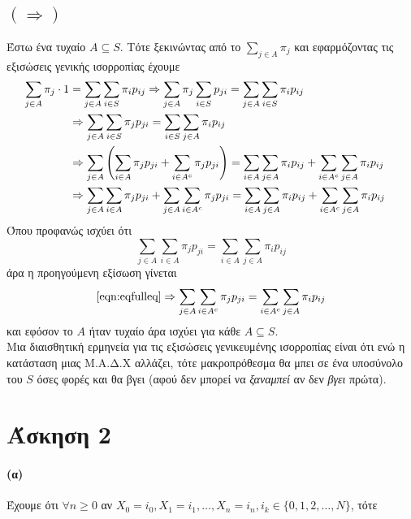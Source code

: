 \documentclass[a4paper,11pt]{article}
\begin{document}
\subsection*{$(\Rightarrow)$}
Έστω ένα τυχαίο $A \subseteq S$. Τότε ξεκινώντας από το $\sum_{j\in A} \pi_j$ και εφαρμόζοντας τις εξισώσεις γενικής ισορροπίας έχουμε
\begin{align}
	\sum_{j\in A} \pi_j \cdot 1  &= \sum_{j\in A} \sum_{i\in S} \pi_i p_{ij}
		\Rightarrow \sum_{j\in A} \pi_j \sum_{i\in S} p_{ji}  = \sum_{j\in A} \sum_{i\in S} \pi_i p_{ij} \notag &\\
		&\Rightarrow \sum_{j\in A} \sum_{i\in S} \pi_j p_{ji}  = \sum_{i\in S} \sum_{j\in A} \pi_i p_{ij} \notag \\
		&\Rightarrow \sum_{j\in A} \left( \sum_{i\in A} \pi_j p_{ji} + \sum_{i\in A^c} \pi_j p_{ji} \right) = \sum_{i\in A} \sum_{j\in A} \pi_i p_{ij} + \sum_{i\in A^c} \sum_{j\in A} \pi_i p_{ij} \notag \\
		&\Rightarrow \sum_{j\in A} \sum_{i\in A} \pi_j p_{ji} + \sum_{j\in A} \sum_{i\in A^c} \pi_j p_{ji} = \sum_{i\in A} \sum_{j\in A} \pi_i p_{ij} + \sum_{i\in A^c} \sum_{j\in A} \pi_i p_{ij} \label{eqn:eqfulleq}
\end{align}
Όπου προφανώς ισχύει ότι
\[
	\sum_{j\in A} \sum_{i\in A} \pi_j p_{ji} = \sum_{i\in A} \sum_{j\in A} \pi_i p_{ij}
\]
άρα η προηγούμενη εξίσωση γίνεται
\[
	\eqref{eqn:eqfulleq} \Rightarrow \sum_{j\in A} \sum_{i\in A^c} \pi_j p_{ji} = \sum_{i\in A^c} \sum_{j\in A} \pi_i p_{ij}
\]
και εφόσον το $A$ ήταν τυχαίο άρα ισχύει για κάθε $A \subseteq S$.
\\[8pt]
Μια διαισθητική ερμηνεία για τις εξισώσεις γενικευμένης ισορροπίας είναι ότι ενώ η κατάσταση μιας Μ.Α.Δ.Χ αλλάζει, τότε μακροπρόθεσμα θα μπει σε ένα υποσύνολο του $S$ όσες φορές και θα βγει (αφού δεν μπορεί να \textit{ξαναμπεί} αν δεν \textit{βγει} πρώτα).


\section*{Άσκηση 2}

\paragraph{(α)}
Έχουμε ότι $\forall n \geq 0$ αν $X_0=i_0, X_1=i_1, \dots, X_n=i_n, i_k \in \{0,1,2,\dots,N\}$, τότε
\end{document}
